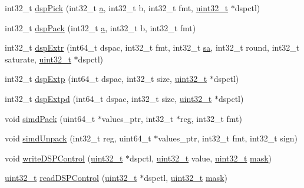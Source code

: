 \begin{DoxyCompactItemize}
\item 
int32\_\-t \hyperlink{namespaceMipsISA_a774010022864d198d9ae706107ad49ea}{dspPick} (int32\_\-t \hyperlink{namespaceMipsISA_ad15ace88a723e43c4e98c8c646891e79}{a}, int32\_\-t b, int32\_\-t fmt, \hyperlink{Type_8hh_a435d1572bf3f880d55459d9805097f62}{uint32\_\-t} $\ast$dspctl)
\item 
int32\_\-t \hyperlink{namespaceMipsISA_a1af18d7c519e520651d9df60ec91b3ec}{dspPack} (int32\_\-t \hyperlink{namespaceMipsISA_ad15ace88a723e43c4e98c8c646891e79}{a}, int32\_\-t b, int32\_\-t fmt)
\item 
int32\_\-t \hyperlink{namespaceMipsISA_add5a0b9b060578a4f173a8e875cd283f}{dspExtr} (int64\_\-t dspac, int32\_\-t fmt, int32\_\-t \hyperlink{namespaceMipsISA_ac5212d09029b84b4ed4df34dd739329a}{sa}, int32\_\-t round, int32\_\-t saturate, \hyperlink{Type_8hh_a435d1572bf3f880d55459d9805097f62}{uint32\_\-t} $\ast$dspctl)
\item 
int32\_\-t \hyperlink{namespaceMipsISA_ad04813c746ce8f173114b51ca2ee74fb}{dspExtp} (int64\_\-t dspac, int32\_\-t size, \hyperlink{Type_8hh_a435d1572bf3f880d55459d9805097f62}{uint32\_\-t} $\ast$dspctl)
\item 
int32\_\-t \hyperlink{namespaceMipsISA_a0b12eac93513ce034deb16dc654db7be}{dspExtpd} (int64\_\-t dspac, int32\_\-t size, \hyperlink{Type_8hh_a435d1572bf3f880d55459d9805097f62}{uint32\_\-t} $\ast$dspctl)
\item 
void \hyperlink{namespaceMipsISA_a74fad38caeb362b68c915e1255139c92}{simdPack} (uint64\_\-t $\ast$values\_\-ptr, int32\_\-t $\ast$reg, int32\_\-t fmt)
\item 
void \hyperlink{namespaceMipsISA_ada59d08ed172da7300eb904edfd82886}{simdUnpack} (int32\_\-t reg, uint64\_\-t $\ast$values\_\-ptr, int32\_\-t fmt, int32\_\-t sign)
\item 
void \hyperlink{namespaceMipsISA_ad74065c805a5647e31fec67534caf1e9}{writeDSPControl} (\hyperlink{Type_8hh_a435d1572bf3f880d55459d9805097f62}{uint32\_\-t} $\ast$dspctl, \hyperlink{Type_8hh_a435d1572bf3f880d55459d9805097f62}{uint32\_\-t} value, \hyperlink{Type_8hh_a435d1572bf3f880d55459d9805097f62}{uint32\_\-t} \hyperlink{namespaceMipsISA_a6d232ec92c51be65510dfa67e967ff39}{mask})
\item 
\hyperlink{Type_8hh_a435d1572bf3f880d55459d9805097f62}{uint32\_\-t} \hyperlink{namespaceMipsISA_a7c5243738a02678e025034797a57ff7d}{readDSPControl} (\hyperlink{Type_8hh_a435d1572bf3f880d55459d9805097f62}{uint32\_\-t} $\ast$dspctl, \hyperlink{Type_8hh_a435d1572bf3f880d55459d9805097f62}{uint32\_\-t} \hyperlink{namespaceMipsISA_a6d232ec92c51be65510dfa67e967ff39}{mask})

\end{DoxyCompactItemize}
